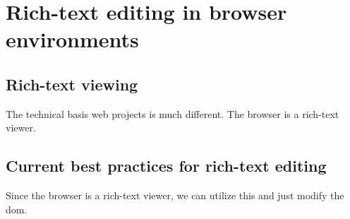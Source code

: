 \chapter{Rich-text editing in browser environments}

\section{Rich-text viewing}

The technical basis web projects is much different.
The browser is a rich-text viewer.

\section{Current best practices for rich-text editing}

Since the browser is a rich-text viewer, we can utilize this and just modify the dom.


